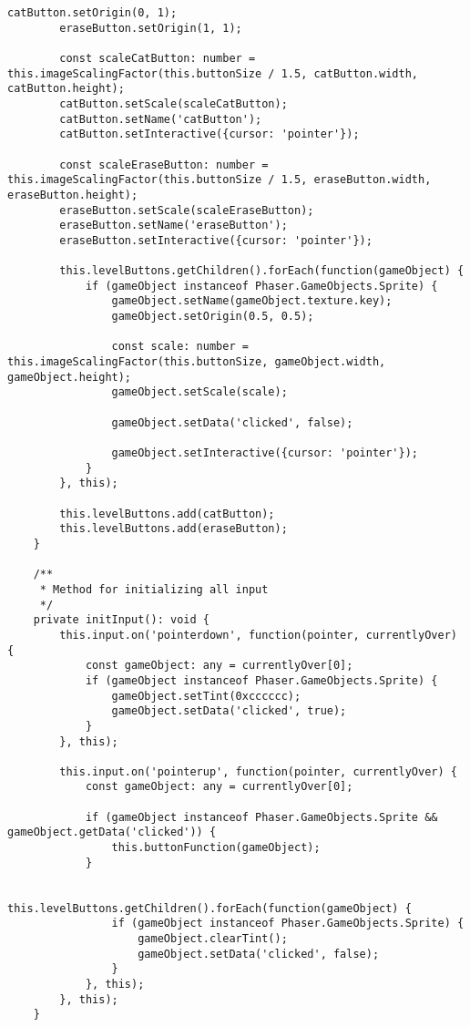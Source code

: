 \begin{lstlisting}[style=TypeScript, caption={levelMenuScene.ts}]
        catButton.setOrigin(0, 1);
        eraseButton.setOrigin(1, 1);

        const scaleCatButton: number = this.imageScalingFactor(this.buttonSize / 1.5, catButton.width, catButton.height);
        catButton.setScale(scaleCatButton);
        catButton.setName('catButton');
        catButton.setInteractive({cursor: 'pointer'});

        const scaleEraseButton: number = this.imageScalingFactor(this.buttonSize / 1.5, eraseButton.width, eraseButton.height);
        eraseButton.setScale(scaleEraseButton);
        eraseButton.setName('eraseButton');
        eraseButton.setInteractive({cursor: 'pointer'});

        this.levelButtons.getChildren().forEach(function(gameObject) {
            if (gameObject instanceof Phaser.GameObjects.Sprite) {
                gameObject.setName(gameObject.texture.key);
                gameObject.setOrigin(0.5, 0.5);

                const scale: number = this.imageScalingFactor(this.buttonSize, gameObject.width, gameObject.height);
                gameObject.setScale(scale);

                gameObject.setData('clicked', false);

                gameObject.setInteractive({cursor: 'pointer'});
            }
        }, this);

        this.levelButtons.add(catButton);
        this.levelButtons.add(eraseButton);
    }

    /**
     * Method for initializing all input
     */
    private initInput(): void {
        this.input.on('pointerdown', function(pointer, currentlyOver) {
            const gameObject: any = currentlyOver[0];
            if (gameObject instanceof Phaser.GameObjects.Sprite) {
                gameObject.setTint(0xcccccc);
                gameObject.setData('clicked', true);
            }
        }, this);

        this.input.on('pointerup', function(pointer, currentlyOver) {
            const gameObject: any = currentlyOver[0];

            if (gameObject instanceof Phaser.GameObjects.Sprite && gameObject.getData('clicked')) {
                this.buttonFunction(gameObject);
            }

            this.levelButtons.getChildren().forEach(function(gameObject) {
                if (gameObject instanceof Phaser.GameObjects.Sprite) {
                    gameObject.clearTint();
                    gameObject.setData('clicked', false);
                }
            }, this);
        }, this);
    }


\end{lstlisting}
